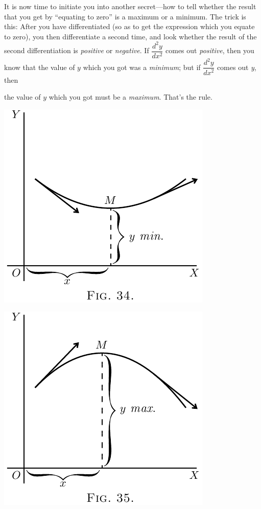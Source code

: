 \documentclass{ximera}
\begin{document}
It is now time to initiate you into another secret---how
to tell whether the result that you get by ``equating to zero'' is a maximum or a minimum.
The trick is this: After you have differentiated
(so as to get the expression which you equate to
zero), you then differentiate a second time, and look
whether the result of the second differentiation is
\textit{positive} or \textit{negative}. If $\dfrac{d^2y}{dx^2}$ comes out \textit{positive}, then
you know that the value of $y$ which you got was
a \textit{minimum}; but if $\dfrac{d^2y}{dx^2}$ comes out \textit{y}, then

the value of $y$ which you got must be a \textit{maximum}.
That's the rule.

\begin{image}
\label{Figure34}
\includegraphics{126a.png}
\end{image}
\begin{image}
\label{Figure35}
\includegraphics{126b.png}
\end{image}
\end{document}

